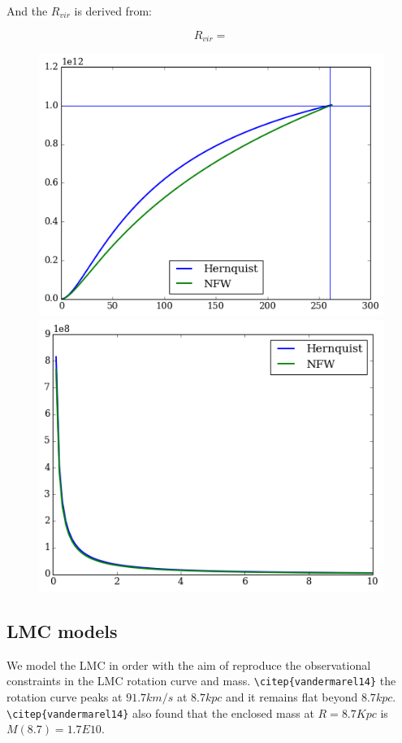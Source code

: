 And the $R_{vir}$ is derived from:

\begin{equation}
R_{vir} =  
\end{equation}


\begin{figure}[H]
\centering
\includegraphics[scale=0.4]{MW_enclosedM.png}
\includegraphics[scale=0.4]{MW_enclosedRho.png}
\end{figure}


\subsection{LMC models}

We model the LMC in order with the aim of reproduce the observational 
constraints in the LMC rotation curve and mass. \verb+\citep{vandermarel14}+
the rotation curve peaks at $91.7 km/s$ at $8.7 kpc$ and it remains flat 
beyond $8.7 kpc$. \verb+\citep{vandermarel14}+ also found that the enclosed
mass at $R = 8.7Kpc$ is $M(8.7) = 1.7E10$.\\

